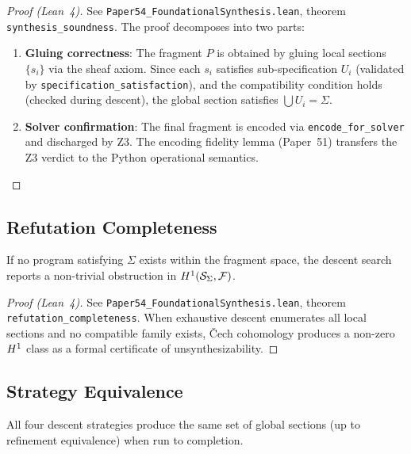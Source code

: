 \documentclass[11pt]{article}
\newcommand{\FragmentSpace}{\mathcal{F}}
\newcommand{\SpecSpace}{\mathcal{S}_\Sigma}
\newcommand{\SpecSat}{\texttt{specification\_satisfaction}}
\begin{document}
\begin{proof}[Proof (Lean~4)]
See \texttt{Paper54\_FoundationalSynthesis.lean}, theorem
\texttt{synthesis\_soundness}.  The proof decomposes into two parts:
\begin{enumerate}[noitemsep]
  \item \textbf{Gluing correctness}: The fragment $P$ is obtained
        by gluing local sections $\{s_i\}$ via the sheaf axiom.
        Since each $s_i$ satisfies sub-specification $U_i$ (validated
        by \SpecSat), and the compatibility condition holds (checked
        during descent), the global section satisfies $\bigcup U_i =
        \Sigma$.
  \item \textbf{Solver confirmation}: The final fragment is encoded
        via \texttt{encode\_for\_solver} and discharged by Z3.  The
        encoding fidelity lemma (Paper~51) transfers the Z3 verdict
        to the Python operational semantics.
\end{enumerate}
\end{proof}

\subsection{Refutation Completeness}

\begin{theorem}\label{thm:refutation}
If no program satisfying $\Sigma$ exists within the fragment space,
the descent search reports a non-trivial obstruction in
$\Hcoh{1}(\SpecSpace, \FragmentSpace)$.
\end{theorem}

\begin{proof}[Proof (Lean~4)]
See \texttt{Paper54\_FoundationalSynthesis.lean}, theorem
\texttt{refutation\_completeness}.  When exhaustive descent
enumerates all local sections and no compatible family exists,
\v{C}ech cohomology produces a non-zero $H^{1}$ class as a
formal certificate of unsynthesizability.
\end{proof}

\subsection{Strategy Equivalence}

\begin{lemma}\label{lem:strategy-equiv}
All four descent strategies produce the same set of global sections
(up to refinement equivalence) when run to completion.
\end{lemma}
\end{document}
